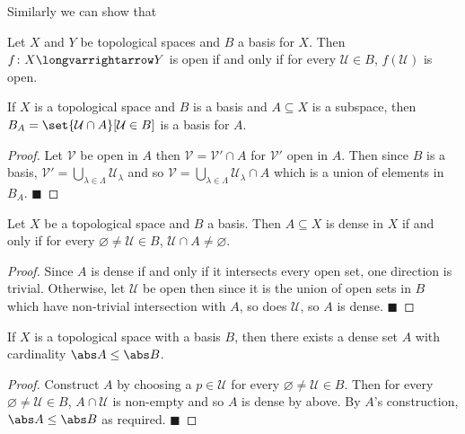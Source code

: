 \documentclass[10pt]{article}
\def\qed{\hskip1cm\penalty-100\hbox{}\hfill$\blacksquare$}
\def\mU{\mathcal{U}}
\def\mV{\mathcal{V}}
\def\longto{\longvarrightarrow}
\begin{document}
Similarly we can show that

\begin{prop*}

    Let $X$ and $Y$ be topological spaces and $B$ a basis for $X$.
    Then $f\colon X\longto Y$ is open if and only if for every $\mU\in B$, $f(\mU)$ is open.

\end{prop*}

\begin{prop*}

    If $X$ is a topological space and $B$ is a basis and $A\subseteq X$ is a subspace, then $B_A=\set{\mU\cap A}[\mU\in B]$ is a basis for $A$.

\end{prop*}

\begin{proof}

    Let $\mV$ be open in $A$ then $\mV=\mV'\cap A$ for $\mV'$ open in $A$.
    Then since $B$ is a basis, $\mV'=\bigcup_{\lambda\in\Lambda}\mU_\lambda$ and so $\mV=\bigcup_{\lambda\in\Lambda}\mU_\lambda\cap A$ which is a union of elements in $B_A$.
    \qed

\end{proof}

\begin{prop*}

    Let $X$ be a topological space and $B$ a basis.
    Then $A\subseteq X$ is dense in $X$ if and only if for every $\varnothing\neq\mU\in B$, $\mU\cap A\neq\varnothing$.

\end{prop*}

\begin{proof}

    Since $A$ is dense if and only if it intersects every open set, one direction is trivial.
    Otherwise, let $\mU$ be open then since it is the union of open sets in $B$ which have non-trivial intersection with $A$, so does $\mU$, so $A$ is dense.
    \qed

\end{proof}

\begin{lemm*}

    If $X$ is a topological space with a basis $B$, then there exists a dense set $A$ with cardinality $\abs A\leq\abs B$.

\end{lemm*}

\begin{proof}

    Construct $A$ by choosing a $p\in\mU$ for every $\varnothing\neq\mU\in B$.
    Then for every $\varnothing\neq\mU\in B$, $A\cap\mU$ is non-empty and so $A$ is dense by above.
    By $A$'s construction, $\abs A\leq\abs B$ as required.
    \qed

\end{proof}
\end{document}
